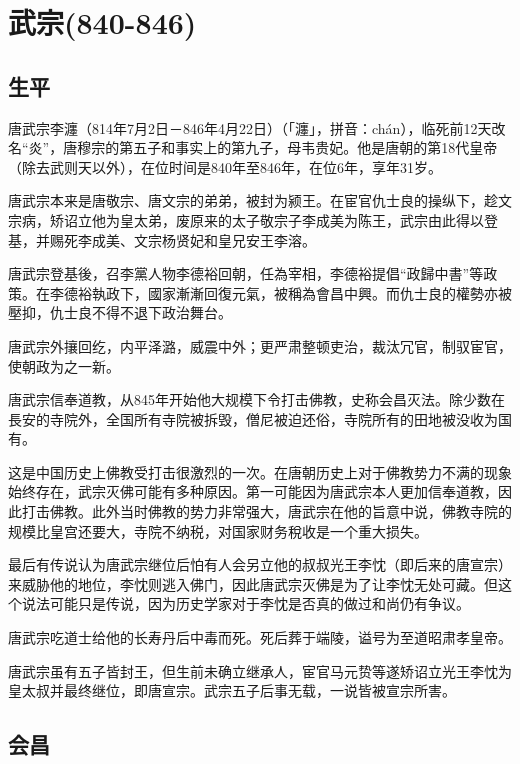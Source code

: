 
\section{武宗\tiny(840-846)}

\subsection{生平}

唐武宗李瀍（814年7月2日－846年4月22日）（「瀍」，拼音：chán），临死前12天改名“炎”，唐穆宗的第五子和事实上的第九子，母韦贵妃。他是唐朝的第18代皇帝（除去武则天以外），在位时间是840年至846年，在位6年，享年31岁。

唐武宗本来是唐敬宗、唐文宗的弟弟，被封为颍王。在宦官仇士良的操纵下，趁文宗病，矫诏立他为皇太弟，废原来的太子敬宗子李成美为陈王，武宗由此得以登基，并赐死李成美、文宗杨贤妃和皇兄安王李溶。

唐武宗登基後，召李黨人物李德裕回朝，任為宰相，李德裕提倡“政歸中書”等政策。在李德裕執政下，國家漸漸回復元氣，被稱為會昌中興。而仇士良的權勢亦被壓抑，仇士良不得不退下政治舞台。

唐武宗外攘回纥，内平泽潞，威震中外；更严肃整顿吏治，裁汰冗官，制驭宦官，使朝政为之一新。

唐武宗信奉道教，从845年开始他大规模下令打击佛教，史称会昌灭法。除少数在長安的寺院外，全国所有寺院被拆毁，僧尼被迫还俗，寺院所有的田地被没收为国有。

这是中国历史上佛教受打击很激烈的一次。在唐朝历史上对于佛教势力不满的现象始终存在，武宗灭佛可能有多种原因。第一可能因为唐武宗本人更加信奉道教，因此打击佛教。此外当时佛教的势力非常强大，唐武宗在他的旨意中说，佛教寺院的规模比皇宫还要大，寺院不纳税，对国家财务稅收是一个重大损失。

最后有传说认为唐武宗继位后怕有人会另立他的叔叔光王李忱（即后来的唐宣宗）来威胁他的地位，李忱则逃入佛门，因此唐武宗灭佛是为了让李忱无处可藏。但这个说法可能只是传说，因为历史学家对于李忱是否真的做过和尚仍有争议。

唐武宗吃道士给他的长寿丹后中毒而死。死后葬于端陵，谥号为至道昭肃孝皇帝。

唐武宗虽有五子皆封王，但生前未确立继承人，宦官马元贽等遂矫诏立光王李忱为皇太叔并最终继位，即唐宣宗。武宗五子后事无载，一说皆被宣宗所害。


\subsection{会昌}

